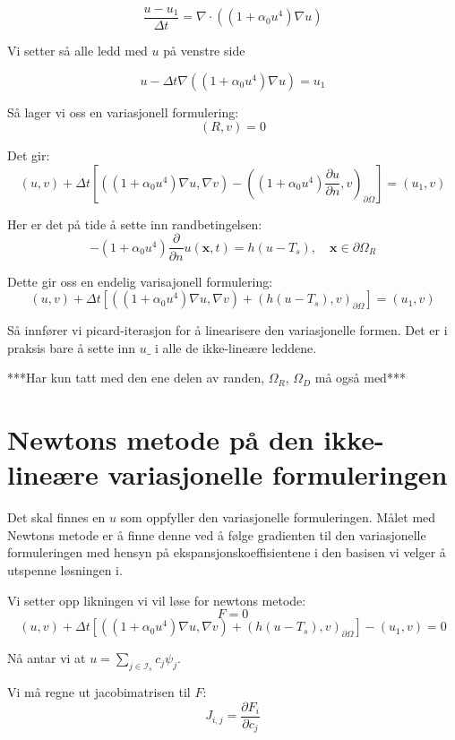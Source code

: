 \documentclass[a4paper, 10pt]{article}
\newcommand{\mb}{\mathbf}
\newcommand{\mc}{\mathcal}
\begin{document}
\begin{equation}
	\frac{u-u_1}{\Delta t} = \nabla \cdot ((1+\alpha_0u^4)\nabla u) 
\end{equation}

Vi setter så alle ledd med $u$ på venstre side

\begin{equation}
	u - \Delta t \nabla ((1+\alpha_0 u^4)\nabla u) = u_1 
\end{equation}

Så lager vi oss en variasjonell formulering:
\begin{equation}
(R, v) = 0
\end{equation}

Det gir:
\begin{equation}
	(u, v) + \Delta t \left[((1+\alpha_0u^4)\nabla u, \nabla v) - 
	\left( (1+\alpha_0 u^4) \frac{\partial u}{\partial n}, v \right)_{\partial \Omega}\right] = (u_1, v)
\end{equation}

Her er det på tide å sette inn randbetingelsen:
\begin{equation}
	-(1+\alpha_0u^4)\frac{\partial}{\partial n} u(\mb{x}, t) = h(u - T_s),\quad
\mb{x}\in\partial\Omega_R
\end{equation}

Dette gir oss en endelig varisajonell formulering:
\begin{equation}
	(u, v) + \Delta t \left[((1+\alpha_0u^4)\nabla u, \nabla v) + 
	\left( h(u-T_s), v \right)_{\partial \Omega}\right] = (u_1, v)
\end{equation}

Så innfører vi picard-iterasjon for å linearisere den variasjonelle formen. Det er i praksis bare å sette inn $u\_$ i alle de ikke-lineære leddene. 

***Har kun tatt med den ene delen av randen, $\Omega_R$, $\Omega_D$ må også med***

\section{Newtons metode på den ikke-lineære variasjonelle formuleringen}
Det skal finnes en $u$ som oppfyller den variasjonelle formuleringen. Målet med Newtons metode er å finne denne ved å følge gradienten til den variasjonelle formuleringen med hensyn på ekspansjonskoeffisientene i den basisen vi velger å utspenne løsningen i. 

Vi setter opp likningen vi vil løse for newtons metode:
\begin{equation}
	F = 0
\end{equation}
\begin{equation}
	(u, v) + \Delta t \left[((1+\alpha_0u^4)\nabla u, \nabla v) + 
	\left( h(u-T_s), v \right)_{\partial \Omega}\right] -(u_1, v) = 0
\end{equation}

Nå antar vi at $u = \sum_{j \in \mc{I}_s} c_j\psi_j$.

Vi må regne ut jacobimatrisen til $F$:
\begin{equation}
	J_{i, j} = \frac{\partial F_i}{\partial c_j}
\end{equation}
\end{document}
